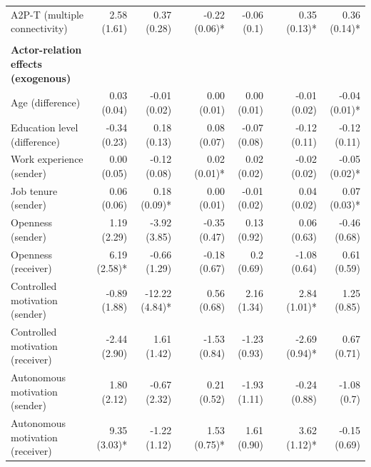 \begin{table}
{\begin{threeparttable}
\begin{tabular}{@{}lrrcrrcrr@{}}
A2P-T (multiple connectivity) & 2.58 (1.61)\phantom{*} & 0.37 (0.28)\phantom{*} &  & -0.22 (0.06)* & -0.06 (0.1)\phantom{*} &  & 0.35 (0.13)* & 0.36 (0.14)* \\ \\
\textbf{Actor-relation effects (exogenous)} & \multicolumn{1}{l}{} & \multicolumn{1}{l}{} &  & \multicolumn{1}{l}{} & \multicolumn{1}{l}{} &  & \multicolumn{1}{l}{} & \multicolumn{1}{l}{} \\
Age (difference) & 0.03 (0.04)\phantom{*} & -0.01 (0.02)\phantom{*} &  & 0.00 (0.01)\phantom{*} & 0.00 (0.01)\phantom{*} &  & -0.01 (0.02)\phantom{*} & -0.04 (0.01)* \\
Education level (difference) & -0.34 (0.23)\phantom{*} & 0.18 (0.13)\phantom{*} &  & 0.08 (0.07)\phantom{*} & -0.07 (0.08)\phantom{*} &  & -0.12 (0.11)\phantom{*} & -0.12 (0.11)\phantom{*} \\
Work experience (sender) & 0.00 (0.05)\phantom{*} & -0.12 (0.08)\phantom{*} &  & 0.02 (0.01)* & 0.02 (0.02)\phantom{*} &  & -0.02 (0.02)\phantom{*} & -0.05 (0.02)* \\
Job tenure (sender) & 0.06 (0.06)\phantom{*} & 0.18 (0.09)* &  & 0.00 (0.01)\phantom{*} & -0.01 (0.02)\phantom{*} &  & 0.04 (0.02)\phantom{*} & 0.07 (0.03)* \\
Openness (sender) & 1.19 (2.29)\phantom{*} & -3.92 (3.85)\phantom{*} &  & -0.35 (0.47)\phantom{*} & 0.13 (0.92)\phantom{*} &  & 0.06 (0.63)\phantom{*} & -0.46 (0.68)\phantom{*} \\
Openness (receiver) & 6.19 (2.58)* & -0.66 (1.29)\phantom{*} &  & -0.18 (0.67)\phantom{*} & 0.2 (0.69)\phantom{*} &  & -1.08 (0.64)\phantom{*} & 0.61 (0.59)\phantom{*} \\
Controlled motivation (sender) & -0.89 (1.88)\phantom{*} & -12.22 (4.84)* &  & 0.56 (0.68)\phantom{*} & 2.16 (1.34)\phantom{*} &  & 2.84 (1.01)* & 1.25 (0.85)\phantom{*} \\
Controlled motivation (receiver) & -2.44 (2.90)\phantom{*} & 1.61 (1.42)\phantom{*} &  & -1.53 (0.84)\phantom{*} & -1.23 (0.93)\phantom{*} &  & -2.69 (0.94)* & 0.67 (0.71)\phantom{*} \\
Autonomous motivation (sender) & 1.80 (2.12)\phantom{*} & -0.67 (2.32)\phantom{*} &  & 0.21 (0.52)\phantom{*} & -1.93 (1.11)\phantom{*} &  & -0.24 (0.88)\phantom{*} & -1.08 (0.7)\phantom{*} \\
Autonomous motivation (receiver) & 9.35 (3.03)* & -1.22 (1.12)\phantom{*} &  & 1.53 (0.75)* & 1.61 (0.90)\phantom{*} &  & 3.62 (1.12)* & -0.15 (0.69)\phantom{*} \\

\end{tabular}
\end{threeparttable}}
\end{table}
